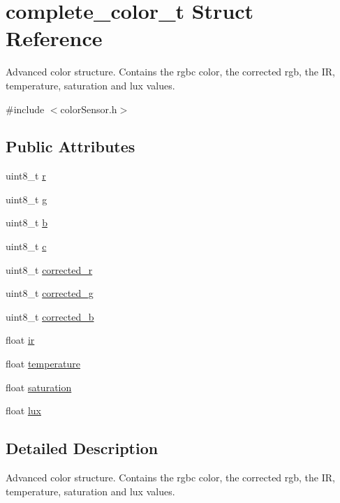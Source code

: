 \hypertarget{structcomplete__color__t}{}\section{complete\+\_\+color\+\_\+t Struct Reference}
\label{structcomplete__color__t}


Advanced color structure. Contains the rgbc color, the corrected rgb, the IR, temperature, saturation and lux values.  




{\ttfamily \#include $<$color\+Sensor.\+h$>$}

\subsection*{Public Attributes}
\begin{DoxyCompactItemize}
\item 
uint8\+\_\+t \hyperlink{structcomplete__color__t_ac605821913e9c5ddff13bc370c2de3e2}{r}
\item 
uint8\+\_\+t \hyperlink{structcomplete__color__t_a9f1d2c86fba640b1c796ed29c5573515}{g}
\item 
uint8\+\_\+t \hyperlink{structcomplete__color__t_a08c4843ad61aa42244744420a579a2ab}{b}
\item 
uint8\+\_\+t \hyperlink{structcomplete__color__t_acca75a7f9456ae897a775ba9af38b732}{c}
\item 
uint8\+\_\+t \hyperlink{structcomplete__color__t_a2fc007276b282e42e47f56506fb1ae41}{corrected\+\_\+r}
\item 
uint8\+\_\+t \hyperlink{structcomplete__color__t_a029be1925dae422b06e6311e2a440965}{corrected\+\_\+g}
\item 
uint8\+\_\+t \hyperlink{structcomplete__color__t_a6fd78ae8ddb9af67ddcf0252a63cc10b}{corrected\+\_\+b}
\item 
float \hyperlink{structcomplete__color__t_ab3046855e29a5b1536b5015b4beac9a3}{ir}
\item 
float \hyperlink{structcomplete__color__t_aa509dee15580b1e32af8c2709c5ee104}{temperature}
\item 
float \hyperlink{structcomplete__color__t_a2313d29f7027137dd1916101eaa4cbd8}{saturation}
\item 
float \hyperlink{structcomplete__color__t_aa88884bb137a437239d76694ccd0cb0d}{lux}
\end{DoxyCompactItemize}


\subsection{Detailed Description}
Advanced color structure. Contains the rgbc color, the corrected rgb, the IR, temperature, saturation and lux values. 

